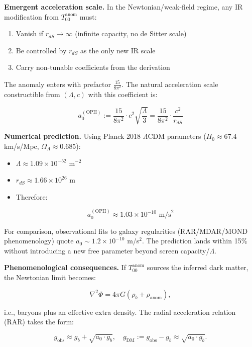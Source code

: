 \documentclass[
]{article}
\providecommand{\tightlist}{%
  \setlength{\itemsep}{0pt}\setlength{\parskip}{0pt}}
\begin{document}
\textbf{Emergent acceleration scale.} In the Newtonian/weak-field
regime, any IR modification from \(T_{00}^{\mathrm{anom}}\) must:

\begin{enumerate}
\def\labelenumi{\arabic{enumi}.}
\tightlist
\item
  Vanish if \(r_{dS} \to \infty\) (infinite capacity, no de Sitter
  scale)
\item
  Be controlled by \(r_{dS}\) as the only new IR scale
\item
  Carry non-tunable coefficients from the derivation
\end{enumerate}

The anomaly enters with prefactor \(\frac{15}{8\pi^2}\). The natural
acceleration scale constructible from \((\Lambda, c)\) with this
coefficient is:

\[
\boxed{
a_0^{\mathrm{(OPH)}} := \frac{15}{8\pi^2} \cdot c^2 \sqrt{\frac{\Lambda}{3}}
= \frac{15}{8\pi^2} \cdot \frac{c^2}{r_{dS}}
}
\]

\textbf{Numerical prediction.} Using Planck 2018 \(\Lambda\)CDM
parameters (\(H_0 \approx 67.4\) km/s/Mpc,
\(\Omega_\Lambda \approx 0.685\)):

\begin{itemize}
\tightlist
\item
  \(\Lambda \approx 1.09 \times 10^{-52}\) m\(^{-2}\)
\item
  \(r_{dS} \approx 1.66 \times 10^{26}\) m
\item
  Therefore:
\end{itemize}

\[
\boxed{
a_0^{\mathrm{(OPH)}} \approx 1.03 \times 10^{-10} \text{ m/s}^2
}
\]

For comparison, observational fits to galaxy regularities (RAR/MDAR/MOND
phenomenology) quote \(a_0 \sim 1.2 \times 10^{-10}\) m/s\(^2\). The
prediction lands within 15\% without introducing a new free parameter
beyond screen capacity/\(\Lambda\).

\textbf{Phenomenological consequences.} If \(T_{00}^{\mathrm{anom}}\)
sources the inferred dark matter, the Newtonian limit becomes:

\[
\nabla^2 \Phi = 4\pi G (\rho_b + \rho_{\mathrm{anom}}),
\]

i.e., baryons plus an effective extra density. The radial acceleration
relation (RAR) takes the form:

\[
g_{\mathrm{obs}} \approx g_b + \sqrt{a_0 \cdot g_b},
\quad
g_{\mathrm{DM}} := g_{\mathrm{obs}} - g_b \approx \sqrt{a_0 \cdot g_b}.
\]
\end{document}
